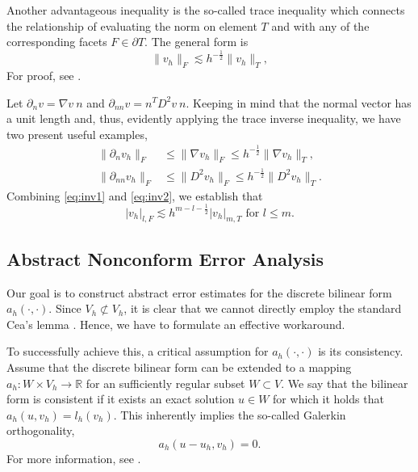 \documentclass[11pt]{article}
\theoremstyle{remark}
\newcommand{\abs}[1]{\left\lvert #1 \right\rvert}
\renewcommand{\le}{\leqslant}
\numberwithin{equation}{section}
\begin{document}
Another advantageous inequality is the so-called trace inequality which connects the relationship of evaluating the norm on element $ T $ and with any of the corresponding facets $F \in \partial T$. The general form is
\begin{equation}
    \label{eq:inv2}
\| v_{h} \|_{F   }^{  }  \lesssim
h^{-\frac{1}{2}} \| v_{h} \|_{ T  }^{  },
\end{equation}
For proof, see \cite[Lemma 12.8]{ErnGuermond2021}.

Let $\partial _{n} v = \nabla v \ n$ and $\partial_{nn} v = n^{T} D^2 v \ n $. Keeping in mind that the normal vector has a unit length and, thus, evidently applying the
trace inverse inequality, we have two present useful examples,
\begin{equation}
    \label{eq:fund_inv_est}
\begin{split}
    \| \partial _{n} v_{h} \|_{F  }^{  }  & \le \| \nabla v_{h} \|_{F  }^{  }  \le h^{-\frac{1}{2}} \| \nabla  v_{h} \|_{T  }^{  },  \\
    \| \partial _{nn} v_{h} \|_{ F }^{  } & \le  \| D^2 v_{h} \|_{ F }^{  }   \le  h^{-\frac{1}{2}} \| D^2 v_{h} \|_{ T }^{  }.
\end{split}
\end{equation}
Combining \eqref{eq:inv1} and \eqref{eq:inv2}, we establish that
\begin{equation}
    \label{eq:general}
\abs{ v_{h} }_{l,F}  \lesssim h^{m-l - \frac{1}{2}} \abs{ v_{h} }_{m, T}
\text{ for } l \le m.
\end{equation}

\subsection{Abstract Nonconform Error Analysis}%
\label{sub:ceas_lemma}

Our goal is to construct abstract error estimates for the discrete bilinear form $a_{h}( \cdot ,\cdot ) $. Since $V_{h} \not \subset V_{h}$, it is clear that we cannot directly employ the standard Cea's lemma \cite[p. 66]{quartdiff}. Hence, we have to formulate an effective workaround.

 To successfully achieve this, a critical assumption for $a_{h}( \cdot ,\cdot )$ is its consistency. Assume that the discrete bilinear form can be extended to a mapping  $a_{h} : W \times V_{h} \to \mathbb{R}$ for an sufficiently regular subset $W \subset V$.
  We say that the bilinear form is consistent if it exists an exact solution $u \in W$ for which it holds that $a_{h}( u,v_{h}) = l_{h}( v_{h})$. This inherently implies the so-called Galerkin orthogonality,
\begin{equation}
    \label{eq:galerin_orth}
a_{h}( u - u_{h}, v_{h}) = 0.
\end{equation}
For more information, see \cite[Definition 1.31]{pietro2012}.
\end{document}
